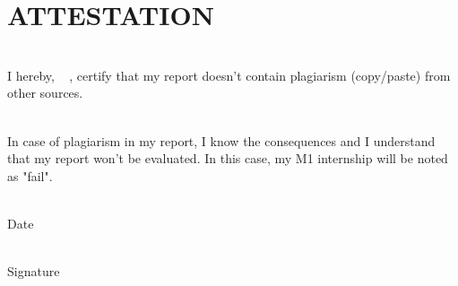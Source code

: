 \chapter*{ATTESTATION}



\vfill


\noindent\hrulefill

~\\


I hereby,  \FirstName~  \LastName, certify that my report doesn't contain plagiarism (copy/paste) from other sources.

~\\

In case of plagiarism in my report, I know the consequences and I understand that my report won't be evaluated. In this case, my M1 internship will be noted as "fail".


~\\

 Date 

~\\
 
 Signature 
 ~\\

 \FirstName~  \LastName
 

~\\
~\\
~\\
~\\
~\\

\noindent\hrulefill


\vfill


\vfill



%
%
%
%
%
%
%
%
%
% 
% 
%
% 
%
%
%
%
%
